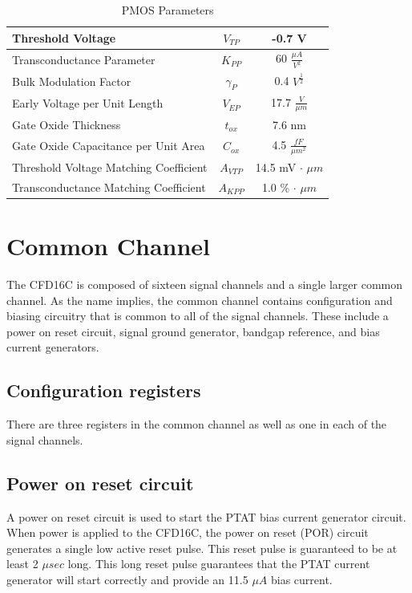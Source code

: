 \documentclass[12pt,oneside,final]{siuethesis}
\theoremstyle{definition}
\begin{document}
 
\begin{table} [htbp!]
\begin{center}
\begin{tabular}{| l | c | c |}
\hline 
Threshold Voltage & $V_{TP}$ & -0.7 V \\ 
\hline 
Transconductance Parameter & $K_{PP}$  &  60 $\frac{\mu A}{V^2}$ \\ 
\hline 
Bulk Modulation Factor & $\gamma_{P}$  &  0.4 $V^{\frac{1}{2}}$ \\ 
\hline 
Early Voltage per Unit Length & $V_{EP}$  &  17.7 $\frac{V}{\mu m}$ \\ 
\hline 
Gate Oxide Thickness & $t_{ox}$  &  7.6 nm \\ 
\hline 
Gate Oxide Capacitance per Unit Area & $C_{ox}$  &  4.5 $\frac{fF}{\mu m^2}$ \\ 
\hline 
Threshold Voltage Matching Coefficient & $A_{VTP}$  &  14.5 mV $\cdot$ $\mu m$ \\ 
\hline 
Transconductance Matching Coefficient & $A_{KPP}$  &  1.0 \% $\cdot$ $\mu m$ \\ 
\hline 
\end{tabular} 
\end{center}
\caption{PMOS Parameters}
\label{TBL:PMOS_PARMS}
\end{table}


\section{Common Channel}
\par The CFD16C is composed of sixteen signal channels and a single larger common channel. As the name implies, the common channel contains configuration and biasing circuitry that is common to all of the signal channels. These include a power on reset circuit, signal ground generator, bandgap reference, and bias current generators.

\subsection{Configuration registers}
\par There are three registers in the common channel as well as one in each of the signal channels. 

\subsection{Power on reset circuit}
\par A power on reset circuit is used to start the PTAT bias current generator circuit. When power is applied to the CFD16C, the power on reset (POR) circuit generates a single low active reset pulse. This reset pulse is guaranteed to be at least 2 $\mu sec$ long. This long reset pulse guarantees that the PTAT current generator will start correctly and provide an 11.5 $\mu A$ bias current.
\end{document}
